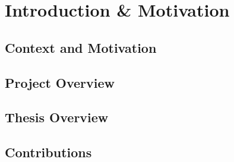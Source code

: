 \chapter{Introduction \& Motivation}

\section{Context and Motivation}

\section{Project Overview}

\section{Thesis Overview}

\section{Contributions}